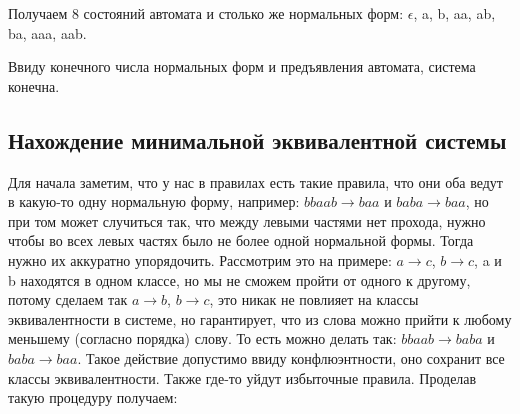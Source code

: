 \documentclass{article}
\begin{document}
\begin{center}
\end{center}

Получаем 8 состояний автомата и столько же нормальных форм: $\epsilon$, a, b, aa, ab, ba, aaa, aab.

Ввиду конечного числа нормальных форм и предъявления автомата, система конечна.

\subsection*{Нахождение минимальной эквивалентной системы}

Для начала заметим, что у нас в правилах есть такие правила, что они оба ведут в какую-то одну нормальную форму, например: $bbaab \rightarrow baa$ и $baba \rightarrow baa$, но при том может случиться так, что между левыми частями нет прохода, нужно чтобы во всех левых частях было не более одной нормальной формы. Тогда нужно их аккуратно упорядочить. Рассмотрим это на примере: $a\rightarrow c$, $b\rightarrow c$, a и b находятся в одном классе, но мы не сможем пройти от одного к другому, потому сделаем так $a\rightarrow b$, $b\rightarrow c$, это никак не повлияет на классы эквивалентности в системе, но гарантирует, что из слова можно прийти к любому меньшему (согласно порядка) слову. То есть можно делать так: $bbaab \rightarrow baba$ и $baba \rightarrow baa$. Такое действие допустимо ввиду конфлюэнтности, оно сохранит все классы эквивалентности. Также где-то уйдут избыточные правила. Проделав такую процедуру получаем:
\end{document}
